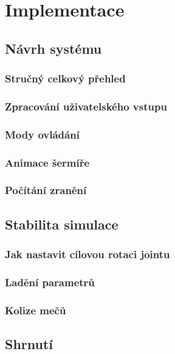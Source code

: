 \chapter{Implementace}

\section{Návrh systému}

\subsection{Stručný celkový přehled}


\subsection{Zpracování uživatelského vstupu}

\subsection{Mody ovládání} \label{modesOfSwordMovementSubsection}

\subsection{Animace šermíře}

\subsection{Počítání zranění}


\section{Stabilita simulace}

\subsection{Jak nastavit cílovou rotaci jointu} \label{howToSetJointsTargetRotationSection}

\subsection{Ladění parametrů} \label{swordParameterTweaksSection}

\subsection{Kolize mečů} \label{swordCollisionsSection}


\section{Shrnutí}

